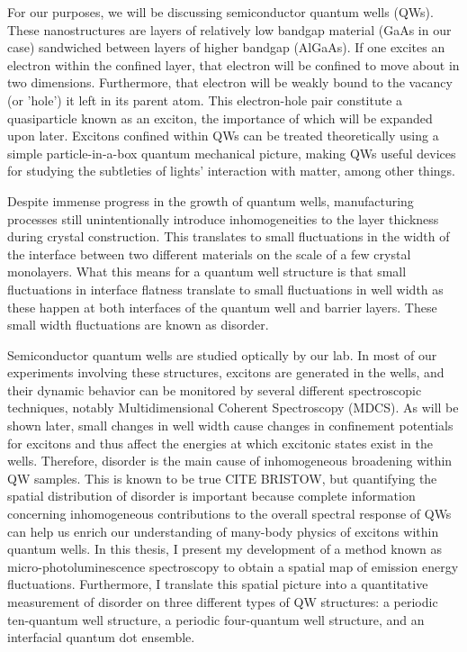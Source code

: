 \indent For our purposes, we will be discussing semiconductor quantum wells (QWs). These nanostructures are layers of relatively low bandgap material (GaAs in our case) sandwiched between layers of higher bandgap (AlGaAs). If one excites an electron within the confined layer, that electron will be confined to move about in two dimensions. Furthermore, that electron will be weakly bound to the vacancy (or 'hole') it left in its parent atom. This electron-hole pair constitute a quasiparticle known as an exciton, the importance of which will be expanded upon later. Excitons confined within QWs can be treated theoretically using a simple particle-in-a-box quantum mechanical picture, making QWs useful devices for studying the subtleties of lights' interaction with matter, among other things.

\indent Despite immense progress in the growth of quantum wells, manufacturing processes still unintentionally introduce inhomogeneities to the layer thickness during crystal construction. This translates to small fluctuations in the width of the interface between two different materials on the scale of a few crystal monolayers. What this means for a quantum well structure is that small fluctuations in interface flatness translate to small fluctuations in well width as these happen at both interfaces of the quantum well and barrier layers. These small width fluctuations are known as disorder.

\indent Semiconductor quantum wells are studied optically by our lab. In most of our experiments involving these structures, excitons are generated in the wells, and their dynamic behavior can be monitored by several different spectroscopic techniques, notably Multidimensional Coherent Spectroscopy (MDCS). As will be shown later, small changes in well width cause changes in confinement potentials for excitons and thus affect the energies at which excitonic states exist in the wells. Therefore, disorder is the main cause of inhomogeneous broadening within QW samples. This is known to be true CITE BRISTOW, but quantifying the spatial distribution of disorder is important because complete information concerning inhomogeneous contributions to the overall spectral response of QWs can help us enrich our understanding of many-body physics of excitons within quantum wells. In this thesis, I present my development of a method known as micro-photoluminescence spectroscopy to obtain a spatial map of emission energy fluctuations. Furthermore, I translate this spatial picture into a quantitative measurement of disorder on three different types of QW structures: a periodic ten-quantum well structure, a periodic four-quantum well structure, and an interfacial quantum dot ensemble. 

